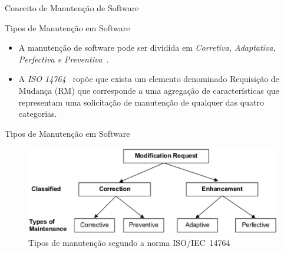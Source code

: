 \documentclass[t,14pt,mathserif]{beamer}
\begin{document}
\begin{frame}{Conceito de Manutenção de Software}
\end{frame}

\begin{frame}{Tipos de Manutenção em Software}
	\begin{itemize}
        \item A manutenção de software pode ser dividida em \textit{Corretiva,
                Adaptativa, Perfectiva e
                Preventiva}~\cite{Lientz:1980:SMM:601062,159342}.

        \item A \textit{ISO 14764}~\cite{1703974} ropõe que exista um elemento
            denominado Requisição de Mudança (RM) que corresponde a uma
            agregação de características que representam uma solicitação de
            manutenção de qualquer das quatro categorias.
	\end{itemize}
\end{frame}

\begin{frame}{Tipos de Manutenção em Software}
    \begin{figure}[hbtp]
        \centering
        \includegraphics[width=.75\textwidth]{../img/modification_request.eps}
        \caption{Tipos de manutenção segundo a norma
                 ISO/IEC~14764~\cite{1703974}}
\label{fig:modification-request}
    \end{figure}
\end{frame}
\end{document}
